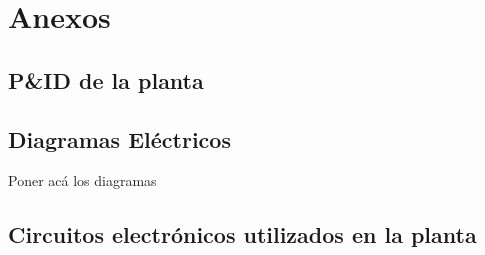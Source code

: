 \chapter{Anexos}
\label{ch:anexos}


\cleardoublepage
\section{P\&ID de la planta}
\label{anexo:pyid}
\section{Diagramas Eléctricos}
\label{anexo:diag}
Poner acá los diagramas

\section{Circuitos electrónicos utilizados en la planta}
\label{anexo:circuitos}



